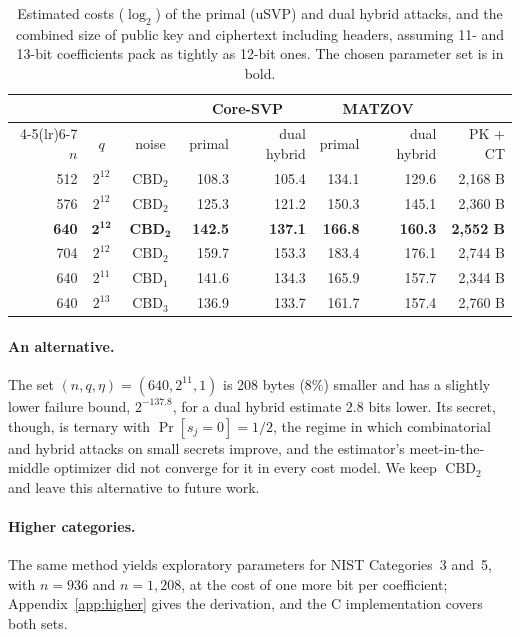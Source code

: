 \documentclass[11pt,a4paper]{article}
\theoremstyle{definition}
\newcommand{\CBD}{\operatorname{CBD}}
\begin{document}
\begin{table}[H]
\centering
\small
\begin{tabular}{rcc rr rr r}
\toprule
& & & \multicolumn{2}{c}{Core-SVP} & \multicolumn{2}{c}{MATZOV} & \\
\cmidrule(lr){4-5}\cmidrule(lr){6-7}
$n$ & $q$ & noise & primal & dual hybrid & primal & dual hybrid & PK + CT \\
\midrule
512 & $2^{12}$ & $\CBD_2$ & 108.3 & 105.4 & 134.1 & 129.6 & 2{,}168 B \\
576 & $2^{12}$ & $\CBD_2$ & 125.3 & 121.2 & 150.3 & 145.1 & 2{,}360 B \\
\textbf{640} & $\mathbf{2^{12}}$ & $\mathbf{\CBD_2}$ & \textbf{142.5} & \textbf{137.1} & \textbf{166.8} & \textbf{160.3} & \textbf{2{,}552 B} \\
704 & $2^{12}$ & $\CBD_2$ & 159.7 & 153.3 & 183.4 & 176.1 & 2{,}744 B \\
640 & $2^{11}$ & $\CBD_1$ & 141.6 & 134.3 & 165.9 & 157.7 & 2{,}344 B \\
640 & $2^{13}$ & $\CBD_3$ & 136.9 & 133.7 & 161.7 & 157.4 & 2{,}760 B \\
\bottomrule
\end{tabular}
\caption{Estimated costs ($\log_2$) of the primal (uSVP) and dual hybrid attacks, and the combined size of public key and ciphertext including headers, assuming 11- and 13-bit coefficients pack as tightly as 12-bit ones. The chosen parameter set is in bold.}
\label{tab:sec-grid}
\end{table}

\paragraph{An alternative.} The set $(n, q, \eta) = (640, 2^{11}, 1)$ is 208 bytes (8\%) smaller and has a slightly lower failure bound, $2^{-137.8}$, for a dual hybrid estimate 2.8 bits lower. Its secret, though, is ternary with $\Pr[s_j = 0] = 1/2$, the regime in which combinatorial and hybrid attacks on small secrets improve, and the estimator's meet-in-the-middle optimizer did not converge for it in every cost model. We keep $\CBD_2$ and leave this alternative to future work.

\paragraph{Higher categories.} The same method yields exploratory parameters for NIST Categories~3 and~5, with $n = 936$ and $n = 1{,}208$, at the cost of one more bit per coefficient; Appendix~\ref{app:higher} gives the derivation, and the C implementation covers both sets.
\end{document}
